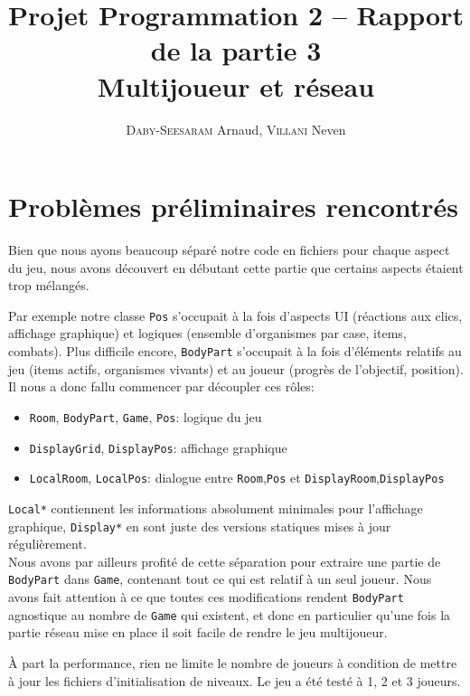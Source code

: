 \documentclass[a4paper,french]{article}
\title{Projet Programmation 2 -- Rapport de la partie 3\\Multijoueur et réseau}
\author{\textsc{Daby-Seesaram} Arnaud, \textsc{Villani} Neven}
\date{}
\newcommand{\ttt}[1]{\texttt{#1}}
\begin{document}
\maketitle

\section{Problèmes préliminaires rencontrés}

Bien que nous ayons beaucoup séparé notre code en fichiers pour chaque aspect du jeu,
nous avons découvert en débutant cette partie que certains aspects étaient trop
mélangés.

Par exemple notre classe \ttt{Pos} s'occupait à la fois d'aspects UI (réactions aux
clics, affichage graphique) et logiques (ensemble d'organismes par case, items, combats).
Plus difficile encore, \ttt{BodyPart} s'occupait à la fois d'éléments relatifs au
jeu (items actifs, organismes vivants) et au joueur (progrès de l'objectif, position).\\

Il nous a donc fallu commencer par découpler ces rôles:
\begin{itemize}
    \item \ttt{Room}, \ttt{BodyPart}, \ttt{Game}, \ttt{Pos}: logique du jeu
    \item \ttt{DisplayGrid}, \ttt{DisplayPos}: affichage graphique
    \item \ttt{LocalRoom}, \ttt{LocalPos}: dialogue entre \ttt{Room},\ttt{Pos} et \ttt{DisplayRoom},\ttt{DisplayPos}
\end{itemize}

\ttt{Local*} contiennent les informations absolument minimales pour l'affichage graphique, \ttt{Display*} en sont
juste des versions statiques mises à jour régulièrement.\\

Nous avons par ailleurs profité de cette séparation pour extraire une partie de
\ttt{BodyPart} dans \ttt{Game}, contenant tout ce qui est relatif à un seul joueur.
Nous avons fait attention à ce que toutes ces modifications rendent \ttt{BodyPart}
agnostique au nombre de \ttt{Game} qui existent, et donc en particulier qu'une fois la
partie réseau mise en place il soit facile de rendre le jeu multijoueur.

\`A part la performance, rien ne limite le nombre de joueurs à condition de mettre à
jour les fichiers d'initialisation de niveaux. Le jeu a été testé à 1, 2 et 3 joueurs.\\
\end{document}
